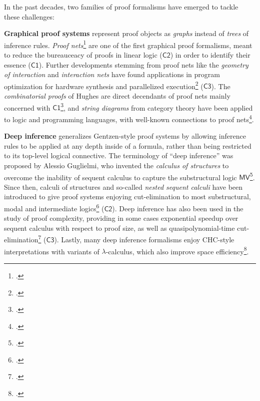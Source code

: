 \documentclass[12pt,draftproposal]{msca-pf}
\newcommand{\CH}[1]{$\mathsf{C#1}$}
\begin{document}
In the past decades, two families of proof formalisms have emerged to tackle these challenges:
\begin{description}
    \item \textbf{Graphical proof systems} represent proof objects as \emph{graphs} instead of
    \emph{trees} of inference rules.
    \emph{Proof nets}\footcite{girard-linear-1987} are one of the first graphical proof formalisms,
    meant to reduce the bureauceacy of proofs in linear logic (\CH{2}) in order to identify their
    essence (\CH{1}). Further developments stemming from proof nets like the \emph{geometry of
    interaction} and \emph{interaction nets} have found applications in program optimization for
    hardware synthesis and parallelized
    execution\footcite{ghicaGeometrySynthesisStructured2007,mackieInteractionNetImplementation2011}
    (\CH{3}). The \emph{combinatorial proofs} of Hughes are direct decendants of proof nets mainly
    concerned with \CH{1}\footcite{Hughes_2006}, and \emph{string diagrams} from category theory have
    been applied to logic and programming languages, with well-known connections to proof
    nets\footcite{piedeleuIntroductionStringDiagrams2025}.

    \item \textbf{Deep inference} generalizes Gentzen-style proof systems by allowing inference
    rules to be applied at any depth inside of a formula, rather than being restricted to its
    top-level logical connective. The terminology of ``deep inference'' was proposed by Alessio
    Guglielmi, who invented the \emph{calculus of structures} to overcome the inability of sequent
    calculus to capture the substructural logic $\mathsf{MV}$\footcite{Guglielmi1999ACO}. Since
    then, calculi of structures and so-called \emph{nested sequent calculi} have been introduced to
    give proof systems enjoying cut-elimination to most substructural, modal and intermediate
    logics\footcite{kuznets_maehara-style_2019,postniece_proof_2010} (\CH{2}). Deep inference has also
    been used in the study of proof complexity, providing in some cases exponential speedup over
    sequent calculus with respect to proof size, as well as quasipolynomial-time
    cut-elimination\footcite{dasRelativeProofComplexity2015a,bruscoliQuasipolynomialNormalisationDeep2016a}
    (\CH{3}). Lastly, many deep inference formalisms enjoy CHC-style interpretations with variants of
    $\lambda$-calculus, which also improve space
    efficiency\footcite{guenot_nested_2013,gundersenAtomicLambdaCalculus2013}.
\end{description}
\end{document}
